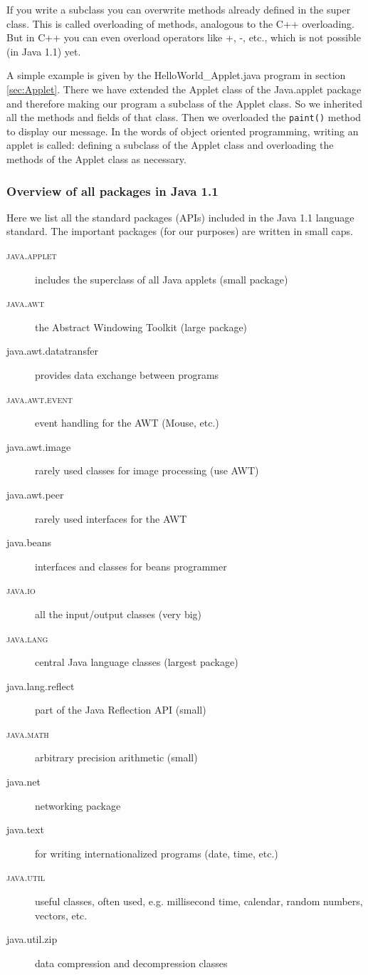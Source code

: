 If you write a subclass you can overwrite methods already defined
in the super class. This is called overloading of methods,
analogous to the C++ overloading. But in C++ you can even
overload operators like +, -, etc., which is not possible (in Java 1.1) yet.

A simple example is given by the
HelloWorld\_Applet.java program in section \ref{sec:Applet}.
There we have extended the Applet class of the Java.applet package
and therefore making our program a subclass of the Applet class.
So we inherited all the methods and fields of that class. Then we
overloaded the \verb|paint()| method to display our message. 
In the words of object oriented programming, writing an applet is
called: defining a subclass of the Applet class and overloading
the methods of the Applet class as necessary.

\subsubsection{Overview of all packages in Java 1.1}

Here we list all the standard packages (APIs) included in the Java 1.1
language standard. The important packages (for our purposes)
are written in small caps.
\begin{description}
\item[\textsc{java.applet}] includes the superclass of all Java applets (small package)
\item[\textsc{java.awt}] the Abstract Windowing Toolkit (large package)
\item[java.awt.datatransfer] provides data exchange between programs
\item[\textsc{java.awt.event}] event handling for the AWT (Mouse, etc.)
\item[java.awt.image] rarely used classes for image processing (use AWT) 
\item[java.awt.peer] rarely used interfaces for the AWT
\item[java.beans] interfaces and classes for beans programmer
\item[\textsc{java.io}] all the input/output classes (very big)
\item[\textsc{java.lang}]  central Java language classes (largest package)
\item[java.lang.reflect] part of the Java Reflection API (small)
\item[\textsc{java.math}] arbitrary precision arithmetic (small)
\item[java.net] networking package
\item[java.text] for writing internationalized programs (date, time, etc.)
\item[\textsc{java.util}] useful classes, often used, e.g. millisecond time,
  calendar, random numbers, vectors, etc.
\item[java.util.zip] data compression and decompression classes
\end{description}

